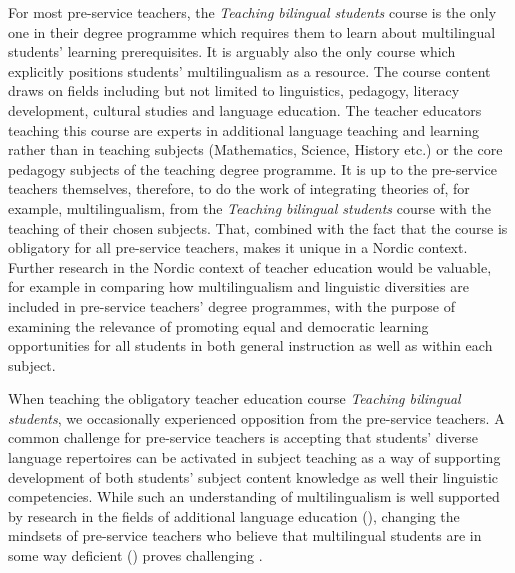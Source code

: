 \documentclass[output=paper]{langscibook}
\begin{document}
For most pre-service teachers, the \textit{Teaching bilingual students} course is the only one in their degree programme which requires them to learn about multilingual students’ learning prerequisites. It is arguably also the only course which explicitly positions students’ multilingualism as a resource. The course content draws on fields including but not limited to linguistics, pedagogy, literacy development, cultural studies and language education. The teacher educators teaching this course are experts in additional language teaching and learning rather than in teaching subjects (Mathematics, Science, History etc.) or the core pedagogy subjects of the teaching degree programme. It is up to the pre-service teachers themselves, therefore, to do the work of integrating theories of, for example, multilingualism, from the \textit{Teaching bilingual students} course with the teaching of their chosen subjects. That, combined with the fact that the course is obligatory for all pre-service teachers, makes it unique in a Nordic context. Further research in the Nordic context of teacher education would be valuable, for example in comparing how multilingualism and linguistic diversities are included in pre-service teachers’ degree programmes, with the purpose of examining the relevance of promoting equal and democratic learning opportunities for all students in both general instruction as well as within each subject.

When teaching the obligatory teacher education course \textit{Teaching bilingual students}, we occasionally experienced opposition from the pre-service teachers. A common challenge for pre-service teachers is accepting that students’ diverse language repertoires can be activated in subject teaching as a way of supporting development of both students’ subject content knowledge as well their linguistic competencies. While such an understanding of multilingualism is well supported by research in the fields of additional language education (\citealt{DaugaardDewilde2017, Garcia2017-1,Schleppegrell2002_Challenges}), changing the mindsets of pre-service teachers who believe that multilingual students are in some way deficient (\citealt{Kristjánsdóttir2006,Kristjánsdóttir2011,Laursen2019}) proves challenging \citep{Jaspers2022}.
\end{document}
